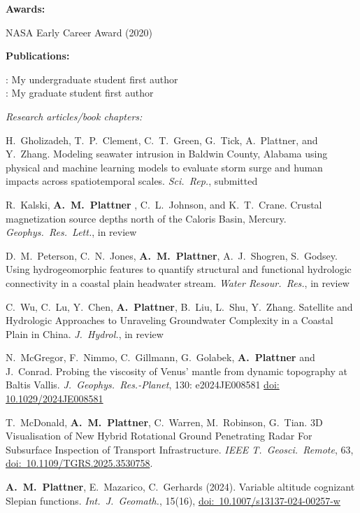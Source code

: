 \documentclass[10pt]{article}
\begin{document}
\spc
\textbf{\tsize Awards:}

\spcp
NASA Early Career Award (2020)


\spc
\textbf{\tsize Publications:}

\spcp
\ug: My undergraduate student first author\\
\gr: My graduate student first author


\spcp
\emph{Research articles/book chapters:}

\spcp
H.\ Gholizadeh, T.\ P.\ Clement, C.\ T.\ Green, G.\ Tick, A.\ Plattner, and Y.\ Zhang. Modeling seawater intrusion in Baldwin County, Alabama using physical and machine learning models to evaluate storm surge and human impacts across spatiotemporal scales. \emph{Sci.\ Rep.}, submitted

\spcp 
\hspace*{-0.26cm} \gr R.\ Kalski, \textbf{A.\ M.\ Plattner} , C.\ L.\ Johnson, and K.\ T.\ Crane. Crustal magnetization source depths north of the Caloris Basin, Mercury. \emph{Geophys.~Res.~Lett.}, in review

\spcp
D.\ M.\ Peterson, C.\ N.\ Jones, \textbf{A.\ M.\ Plattner}, A.\ J.\ Shogren, S.\ Godsey. Using hydrogeomorphic features to quantify structural and functional hydrologic connectivity in a coastal plain headwater stream. \emph{Water Resour.\ Res.}, in review

\spcp C.\ Wu, C.\ Lu, Y.\ Chen, \textbf{A.\ Plattner}, B.\ Liu, L.\ Shu, Y.\ Zhang. Satellite and Hydrologic Approaches to Unraveling Groundwater Complexity in a Coastal Plain in China. \emph{J.\ Hydrol.}, in review

\spcp
\shift[20] N.\ McGregor, F.\ Nimmo, C.\ Gillmann, G.\ Golabek, \textbf{A.\ Plattner} and J.\ Conrad. Probing the viscosity of Venus' mantle from dynamic topography at Baltis Vallis. \emph{J.~Geophys.~Res.-Planet}, 130: e2024JE008581 \href{https://doi.org/10.1029/2024JE008581}{doi: 10.1029/2024JE008581}

\spcp
\shift[19]
T.\ McDonald, \textbf{A.\ M.\ Plattner}, C.\ Warren, M.\ Robinson, G.\ Tian. 3D Visualisation of New Hybrid Rotational Ground Penetrating Radar For Subsurface Inspection of Transport Infrastructure. \emph{IEEE T.\ Geosci.\ Remote}, 63,  \href{https://doi.org/10.1109/TGRS.2025.3530758}{doi:~10.1109/TGRS.2025.3530758}.

\spcp
\shift[18] \textbf{A.~M.~Plattner}, E.\ Mazarico, C.\ Gerhards (2024). Variable altitude cognizant Slepian functions. \emph{Int.~J.~Geomath.}, 15(16), \href{https://doi.org/10.1007/s13137-024-00257-w}{doi:~10.1007/s13137-024-00257-w}
\end{document}
